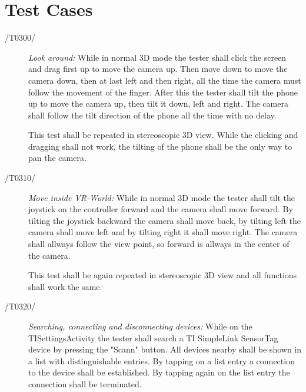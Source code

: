 \section{Test Cases}





\begin{description}
  \item[/T0300/]
    \textit{Look around:} While in normal 3D mode the tester shall click the screen and drag first up to move the camera up.
    Then move down to move the camera down, then at last left and then right, all the time the camera must follow the movement of the finger.
    After this the tester shall tilt the phone up to move the camera up, then tilt it down, left and right. The camera shall follow the tilt direction of the phone all the time with no delay.

    This test shall be repeated in stereoscopic 3D view. While the clicking and dragging shall not work, the tilting of the phone shall be the only way to pan the camera.
\end{description}

\begin{description}
  \item[/T0310/]
    \textit{Move inside VR-World:} While in normal 3D mode the tester shall tilt the joystick on the controller forward and the camera shall move forward.
    By tilting the joystick backward the camera shall move back, by tilting left the camera shall move left and by tilting right it shall move right.
    The camera shall allways follow the view point, so forward is allways in the center of the camera.

    This test shall be again repeated in stereoscopic 3D view and all functions shall work the same.
\end{description}

\begin{description}
	\item[/T0320/]
	\textit{Searching, connecting and disconnecting devices:} While on the TISettingsActivity the tester shall search a TI SimpleLink SensorTag device by pressing the "Scann" button. All devices nearby shall be shown in a list with distinguishable entries. By tapping on a list entry a connection to the device shall be established.
	By tapping again on the list entry the connection shall be terminated.
\end{description}

